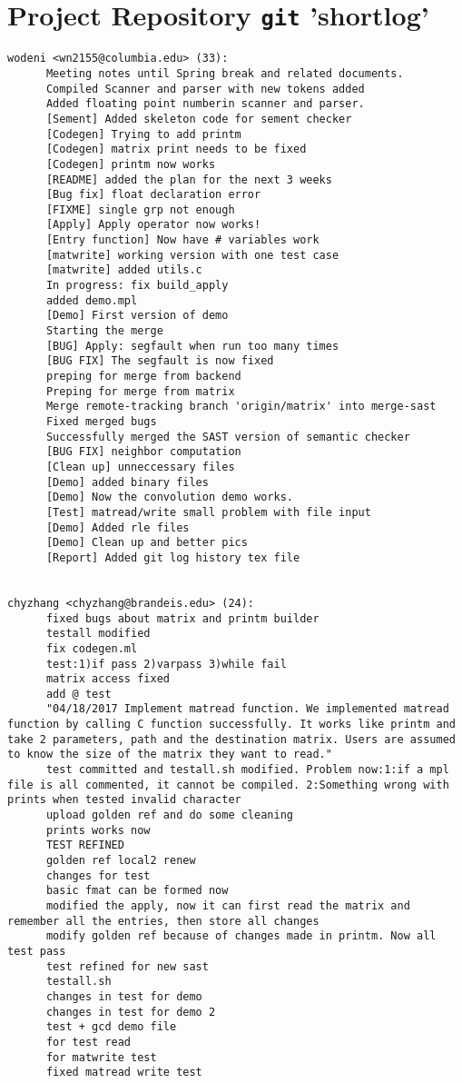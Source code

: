 \section{Project Repository \texttt{git} 'shortlog'}
\lstset{numbers=none,frame=none}
\begin{lstlisting}
wodeni <wn2155@columbia.edu> (33):
      Meeting notes until Spring break and related documents.
      Compiled Scanner and parser with new tokens added
      Added floating point numberin scanner and parser.
      [Sement] Added skeleton code for sement checker
      [Codegen] Trying to add printm
      [Codegen] matrix print needs to be fixed
      [Codegen] printm now works
      [README] added the plan for the next 3 weeks
      [Bug fix] float declaration error
      [FIXME] single grp not enough
      [Apply] Apply operator now works!
      [Entry function] Now have # variables work
      [matwrite] working version with one test case
      [matwrite] added utils.c
      In progress: fix build_apply
      added demo.mpl
      [Demo] First version of demo
      Starting the merge
      [BUG] Apply: segfault when run too many times
      [BUG FIX] The segfault is now fixed
      preping for merge from backend
      Preping for merge from matrix
      Merge remote-tracking branch 'origin/matrix' into merge-sast
      Fixed merged bugs
      Successfully merged the SAST version of semantic checker
      [BUG FIX] neighbor computation
      [Clean up] unneccessary files
      [Demo] added binary files
      [Demo] Now the convolution demo works.
      [Test] matread/write small problem with file input
      [Demo] Added rle files
      [Demo] Clean up and better pics
      [Report] Added git log history tex file


chyzhang <chyzhang@brandeis.edu> (24):
      fixed bugs about matrix and printm builder
      testall modified
      fix codegen.ml
      test:1)if pass 2)varpass 3)while fail
      matrix access fixed
      add @ test
      "04/18/2017 Implement matread function. We implemented matread function by calling C function successfully. It works like printm and take 2 parameters, path and the destination matrix. Users are assumed to know the size of the matrix they want to read."
      test committed and testall.sh modified. Problem now:1:if a mpl file is all commented, it cannot be compiled. 2:Something wrong with prints when tested invalid character
      upload golden ref and do some cleaning
      prints works now
      TEST REFINED
      golden ref local2 renew
      changes for test
      basic fmat can be formed now
      modified the apply, now it can first read the matrix and remember all the entries, then store all changes
      modify golden ref because of changes made in printm. Now all test pass
      test refined for new sast
      testall.sh
      changes in test for demo
      changes in test for demo 2
      test + gcd demo file
      for test read
      for matwrite test
      fixed matread write test



\end{lstlisting}
